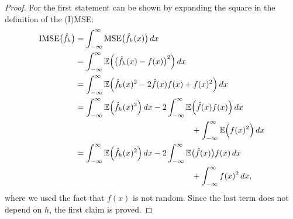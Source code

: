 \documentclass[
  a4paper,
]{article}
\theoremstyle{definition}
\theoremstyle{definition}
\theoremstyle{definition}
\theoremstyle{definition}
\theoremstyle{remark}
\begin{document}
\begin{proof}
For the first statement can be shown by expanding the square in the
definition of the (I)MSE:
\begin{align*}
  \mathrm{IMSE}\bigl( \hat f_h \bigr)
  &= \int_{-\infty}^\infty \mathop{\mathrm{MSE}}\nolimits\bigl( \hat f_h(x) \bigr) \,dx \\
  &= \int_{-\infty}^\infty \mathbb{E}\Bigl( \bigl( \hat f_h(x) - f(x) \bigr)^2 \Bigr) \,dx \\
  &= \int_{-\infty}^\infty \mathbb{E}\Bigl( \hat f_h(x)^2 - 2 \hat f(x) f(x)  + f(x)^2 \Bigr) \,dx \\
  &= \int_{-\infty}^\infty \mathbb{E}\Bigl( \hat f_h(x)^2 \Bigr) \,dx
         - 2 \int_{-\infty}^\infty \mathbb{E}\Bigl( \hat f(x) f(x) \Bigr) \,dx \\
      &\hskip5cm
         + \int_{-\infty}^\infty \mathbb{E}\Bigl( f(x)^2 \Bigr) \,dx \\
  &= \int_{-\infty}^\infty \mathbb{E}\Bigl( \hat f_h(x)^2 \Bigr) \,dx
         - 2 \int_{-\infty}^\infty \mathbb{E}\bigl( \hat f(x) \bigr) f(x) \,dx \\
      &\hskip5cm
         + \int_{-\infty}^\infty f(x)^2 \,dx,
\end{align*}
where we used the fact that \(f(x)\) is not random.
Since the last term does not depend on \(h\), the first claim is proved.


\end{proof}
\end{document}
